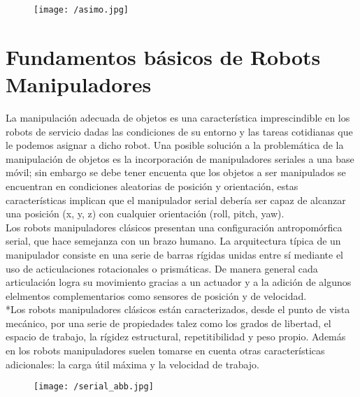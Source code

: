 \documentclass[a4paper, openright, 12pt]{report}
\begin{document}
		\begin{figure}[htb]
			\begin{center}
			\texttt{[image: /asimo.jpg]}
			\end{center}
		\end{figure}




	\section{Fundamentos básicos de Robots Manipuladores}
		La manipulación adecuada de objetos es una característica imprescindible en los robots de servicio dadas las condiciones de su entorno y las tareas cotidianas que le podemos asignar a dicho robot. Una posible solución a la problemática de la manipulación de objetos es la incorporación de manipuladores seriales a una base móvil; sin embargo se debe tener encuenta que los objetos a ser manipulados se encuentran en condiciones aleatorias de posición y orientación, estas características implican que el manipulador serial debería ser capaz de alcanzar una posición (x, y, z) con cualquier orientación (roll, pitch, yaw).\\

		Los robots manipuladores clásicos presentan una configuración antropomórfica serial, que hace semejanza con un brazo humano. La arquitectura típica de un manipulador consiste en una serie de barras rígidas unidas entre sí mediante el uso de acticulaciones rotacionales o prismáticas. De manera general cada articulación logra su movimiento gracias a un actuador y a la adición de algunos elelmentos complementarios como sensores de posición y de velocidad\cite{baturone2005}.\\

		*Los robots manipuladores clásicos están caracterizados, desde el punto de vista mecánico, por una serie de propiedades talez como los grados de libertad, el espacio de trabajo, la rígidez estructural, repetitibilidad y peso propio. Además en los robots manipuladores suelen tomarse en cuenta otras características adicionales: la carga útil máxima y la velocidad de trabajo.\\

		\begin{figure}[htb]
			\begin{center}
			\texttt{[image: /serial\_abb.jpg]}
			\end{center}
		\end{figure}
\end{document}
